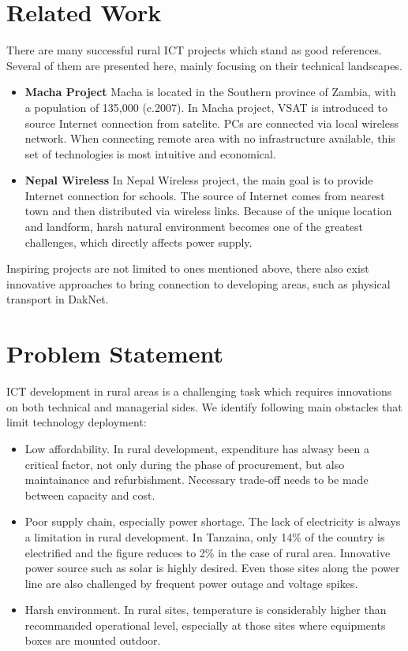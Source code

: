 \section{Related Work}
There are many successful rural ICT projects which stand as good references. Several of them are presented here, mainly focusing on their technical landscapes.
\begin{itemize}
\item \textbf{Macha Project}
Macha is located in the Southern province of Zambia, with a population of 135,000 (c.2007). In Macha project\cite{matthee2007bringing}, VSAT is introduced to source Internet connection from satelite. PCs are connected via local wireless network. When connecting remote area with no infrastructure available, this set of technologies is most intuitive and economical.
\item \textbf{Nepal Wireless}
In Nepal Wireless project, the main goal is to provide Internet connection for schools. The source of Internet comes from nearest town and then distributed via wireless links. Because of the unique location and landform, harsh natural environment becomes one of the greatest challenges, which directly affects power supply\cite{pun2006nepal}.
\end{itemize}
Inspiring projects are not limited to ones mentioned above, there also exist innovative approaches to bring connection to developing areas, such as physical transport in DakNet\cite{pentland2004daknet}.

\section{Problem Statement}
ICT development in rural areas is a challenging task which requires innovations on both technical and managerial sides. We identify following main obstacles that limit technology deployment:
\begin{itemize}
\item Low affordability. In rural development, expenditure has alwasy been a critical factor, not only during the phase of procurement, but also maintainance and refurbishment. Necessary trade-off needs to be made between capacity and cost.
\item Poor supply chain, especially power shortage. The lack of electricity is always a limitation in rural development. In Tanzaina, only 14\% of the country is electrified and the figure reduces to 2\% in the case of rural area\cite{XXX}. Innovative power source such as solar is highly desired. Even those sites along the power line are also challenged by frequent power outage and voltage spikes.
\item Harsh environment. In rural sites, temperature is considerably higher than recommanded operational level, especially at those sites where equipments boxes are mounted outdoor.
\end{itemize}

